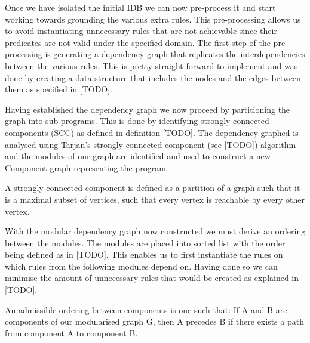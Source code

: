 Once we have isolated the initial IDB we can now pre-process it and start working towards grounding the various extra rules. This pre-processing allows us to avoid instantiating unnecessary rules that are not achievable since their predicates are not valid under the specified domain. The first step of the pre-processing is generating a dependency graph that replicates the interdependencies between the various rules. This is pretty straight forward to implement and was done by creating a data structure that includes the nodes and the edges between them as specified in  [TODO].

Having established the dependency graph we now proceed by partitioning the graph into sub-programs. This is done by identifying strongly connected components (SCC) as defined in definition [TODO].	The dependency graphed is analysed using Tarjan's strongly connected component (see [TODO]) algorithm and the modules of our graph are identified and used to construct a new Component graph representing the program.

\begin{defn} A strongly connected component is defined as a partition of a graph such that it is a maximal subset of vertices, such that every vertex is reachable by every other vertex.
\end{defn}

With the modular dependency graph now constructed we must derive an ordering between the modules. The modules are placed into sorted list with the order being defined as in [TODO]. This enables us to first instantiate the rules on which rules from the following modules depend on. Having done so we can minimise the amount of unnecessary rules that would be created as explained in [TODO].

\begin{defn} An admissible ordering between components is one such that:
If A and B are components of our modularised graph G, then A precedes B if there exists a path from component A to component B.
\end{defn}

